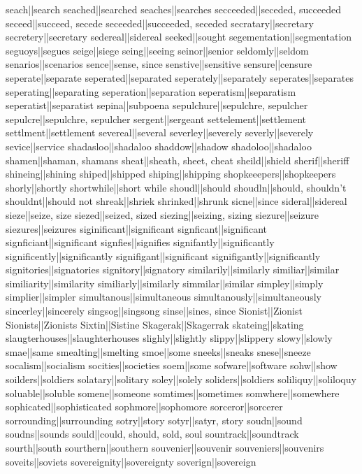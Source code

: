 seach||search
seached||searched
seaches||searches
secceeded||seceded, succeeded
seceed||succeed, secede
seceeded||succeeded, seceded
secratary||secretary
secretery||secretary
sedereal||sidereal
seeked||sought
segementation||segmentation
seguoys||segues
seige||siege
seing||seeing
seinor||senior
seldomly||seldom
senarios||scenarios
sence||sense, since
senstive||sensitive
sensure||censure
seperate||separate
seperated||separated
seperately||separately
seperates||separates
seperating||separating
seperation||separation
seperatism||separatism
seperatist||separatist
sepina||subpoena
sepulchure||sepulchre, sepulcher
sepulcre||sepulchre, sepulcher
sergent||sergeant
settelement||settlement
settlment||settlement
severeal||several
severley||severely
severly||severely
sevice||service
shadasloo||shadaloo
shaddow||shadow
shadoloo||shadaloo
shamen||shaman, shamans
sheat||sheath, sheet, cheat
sheild||shield
sherif||sheriff
shineing||shining
shiped||shipped
shiping||shipping
shopkeeepers||shopkeepers
shorly||shortly
shortwhile||short while
shoudl||should
shoudln||should, shouldn't
shouldnt||should not
shreak||shriek
shrinked||shrunk
sicne||since
sideral||sidereal
sieze||seize, size
siezed||seized, sized
siezing||seizing, sizing
siezure||seizure
siezures||seizures
siginificant||significant
signficant||significant
signficiant||significant
signfies||signifies
signifantly||significantly
significently||significantly
signifigant||significant
signifigantly||significantly
signitories||signatories
signitory||signatory
similarily||similarly
similiar||similar
similiarity||similarity
similiarly||similarly
simmilar||similar
simpley||simply
simplier||simpler
simultanous||simultaneous
simultanously||simultaneously
sincerley||sincerely
singsog||singsong
sinse||sines, since
Sionist||Zionist
Sionists||Zionists
Sixtin||Sistine
Skagerak||Skagerrak
skateing||skating
slaugterhouses||slaughterhouses
slighly||slightly
slippy||slippery
slowy||slowly
smae||same
smealting||smelting
smoe||some
sneeks||sneaks
snese||sneeze
socalism||socialism
socities||societies
soem||some
sofware||software
sohw||show
soilders||soldiers
solatary||solitary
soley||solely
soliders||soldiers
soliliquy||soliloquy
soluable||soluble
somene||someone
somtimes||sometimes
somwhere||somewhere
sophicated||sophisticated
sophmore||sophomore
sorceror||sorcerer
sorrounding||surrounding
sotry||story
sotyr||satyr, story
soudn||sound
soudns||sounds
sould||could, should, sold, soul
sountrack||soundtrack
sourth||south
sourthern||southern
souvenier||souvenir
souveniers||souvenirs
soveits||soviets
sovereignity||sovereignty
soverign||sovereign

